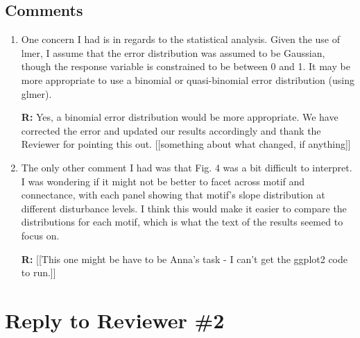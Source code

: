 \documentclass[12pt]{article}
\begin{document}
    \subsection*{Comments}

        \begin{enumerate}

            \item One concern I had is in regards to the statistical analysis. Given the use of lmer, I assume that the error distribution was assumed to be Gaussian, though the response variable is constrained to be between 0 and 1. It may be more appropriate to use a binomial or quasi-binomial error distribution (using glmer).

            \textbf{R:} Yes, a binomial error distribution would be more appropriate. We have corrected the error and updated our results accordingly and thank the Reviewer for pointing this out. [[something about what changed, if anything]]

            \item The only other comment I had was that Fig. 4 was a bit difficult to interpret. I was wondering if it might not be better to facet across motif and connectance, with each panel showing that motif's slope distribution at different disturbance levels. I think this would make it easier to compare the distributions for each motif, which is what the text of the results seemed to focus on.

            \textbf{R:} [[This one might be have to be Anna's task - I can't get the ggplot2 code to run.]]

        \end{enumerate}

\clearpage

\section*{Reply to Reviewer \#2}
\end{document}
